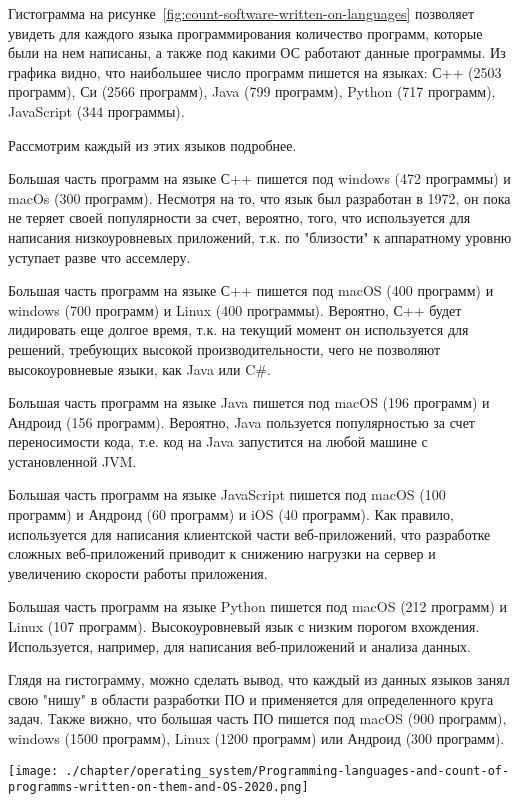 Гистограмма на рисунке~\ref{fig:count-software-written-on-languages} позволяет увидеть для каждого языка программирования количество программ, которые были на нем написаны, а также под какими ОС работают данные программы. Из графика видно, что наибольшее число программ пишется на языках: С++ (2503 программ), Си (2566 программ), Java (799 программ), Python (717 программ),  JavaScript (344 программы).

Рассмотрим каждый из этих языков подробнее.

Большая часть программ на языке С++ пишется под windows (472 программы) и macOs (300 программ). Несмотря на то, что язык был разработан в 1972, он пока не теряет своей популярности за счет, вероятно, того, что используется для написания низкоуровневых приложений, т.к. по "близости" к аппаратному уровню уступает разве что ассемлеру.

Большая часть программ на языке С++ пишется под macOS (400 программ) и windows (700 программ) и Linux (400 программы). Вероятно, С++ будет лидировать еще долгое время, т.к. на текущий момент он используется для решений, требующих высокой производительности, чего не позволяют высокоуровневые языки, как Java или C\#.

Большая часть программ на языке Java пишется под macOS (196 программ) и Андроид (156 программ). Вероятно, Java пользуется популярностью за счет переносимости кода, т.е. код на Java запустится на любой машине с установленной JVM.

Большая часть программ на языке JavaScript пишется под macOS (100 программ) и Андроид (60 программ) и iOS (40 программ). Как правило, используется для написания клиентской части веб-приложений, что разработке сложных веб-приложений приводит к снижению нагрузки на сервер и увеличению скорости работы приложения.

Большая часть программ на языке Python пишется под macOS (212 программ) и Linux (107 программ). Высокоуровневый язык с низким порогом вхождения. Используется, например, для написания веб-приложений и анализа данных.

Глядя на гистограмму, можно сделать вывод, что каждый из данных языков занял свою "нишу" в области разработки ПО и применяется для определенного круга задач. Также вижно, что большая часть ПО пишется под macOS (900 программ), windows (1500 программ), Linux (1200 программ) или Андроид (300 программ).


\begin{figure*}[h!]
	\texttt{[image: ./chapter/operating\_system/Programming-languages-and-count-of-programms-written-on-them-and-OS-2020.png]}
	\caption{Языки программирования и количества ОС, под которыми работают программы, написанные на них 2020 год.}
	\label{fig:count-software-written-on-languages}
\end{figure*}
